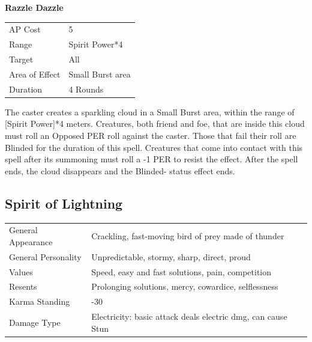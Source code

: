 \documentclass[11pt,a4paper,twocolumn]{book}
\begin{document}
\bigskip
\noindent

\pagebreak
\noindent
\textbf{Razzle Dazzle}

\smallskip
{
	\begin{tabu} to 70mm{| X[l,4] | X[l,7] |}
		\hline
        AP Cost	      	& 5 							\\
        Range     		& Spirit Power*4				\\
        Target      	& All							\\
        Area of Effect  & Small Burst area  	 		\\
        Duration     	& 4 Rounds						\\ \hline
	\end{tabu}
		
}
\smallskip

The caster creates a sparkling cloud in a Small Burst area, within the range of [Spirit Power]*4 meters. Creatures, both friend and foe, that are inside this cloud must roll an Opposed PER roll against the caster. Those that fail their roll are Blinded for the duration of this spell. Creatures that come into contact with this spell after its summoning must roll a -1 PER to resist the effect. After the spell ends, the cloud disappears and the Blinded- status effect ends.
\vfill
\pagebreak

\subsection*{Spirit of Lightning}
{
	\begin{tabu} to 75mm{| X[l,4] | X[l,8] |}
		\hline
		General Appearance		& Crackling, fast-moving bird of prey made of thunder				\\
        General Personality	   	& Unpredictable, stormy, sharp, direct, proud						\\
        Values     				& Speed, easy and fast solutions, pain, competition					\\
        Resents     			& Prolonging solutions, mercy, cowardice, selflessness 				\\
        Karma Standing      	& -30																\\
        Damage Type 			& Electricity: basic attack deals electric dmg, can cause Stun	 	\\ \hline
	\end{tabu}
		
}
\end{document}
